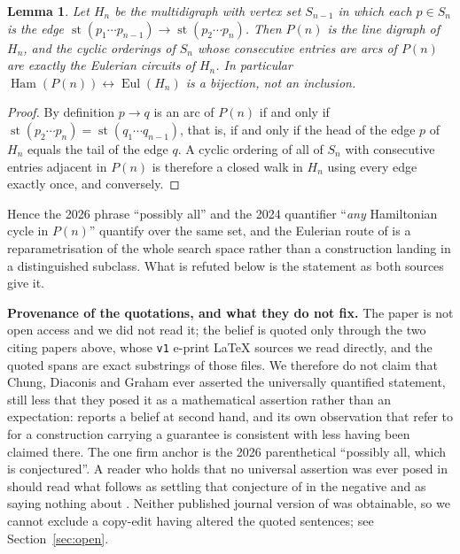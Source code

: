 \documentclass[11pt]{amsart}
\newtheorem{lemma}[theorem]{Lemma}
\DeclareMathOperator{\stt}{st}
\DeclareMathOperator{\Ham}{Ham}
\DeclareMathOperator{\Eul}{Eul}
\begin{document}
\begin{lemma}\label{lem:bij}
Let $H_n$ be the multidigraph with vertex set $S_{n-1}$ in which each
$p\in S_n$ is the edge $\stt(p_1\cdots p_{n-1})\to\stt(p_2\cdots p_n)$. Then
$P(n)$ is the line digraph of $H_n$, and the cyclic orderings of $S_n$ whose
consecutive entries are arcs of $P(n)$ are exactly the Eulerian circuits of
$H_n$. In particular $\Ham(P(n))\leftrightarrow\Eul(H_n)$ is a bijection, not
an inclusion.
\end{lemma}

\begin{proof}
By definition $p\to q$ is an arc of $P(n)$ if and only if
$\stt(p_2\cdots p_n)=\stt(q_1\cdots q_{n-1})$, that is, if and only if the head
of the edge $p$ of $H_n$ equals the tail of the edge $q$. A cyclic ordering of
all of $S_n$ with consecutive entries adjacent in $P(n)$ is therefore a closed
walk in $H_n$ using every edge exactly once, and conversely.
\end{proof}

Hence the 2026 phrase ``possibly all'' and the 2024 quantifier ``\emph{any}
Hamiltonian cycle in $P(n)$'' quantify over the same set, and the Eulerian
route of \cite{KQ2026} is a reparametrisation of the whole search space rather
than a construction landing in a distinguished subclass. What is refuted below
is the statement as both sources give it.

\medskip\noindent\textbf{Provenance of the quotations, and what they do not
fix.} The paper \cite{CDG1992} is not open access and we did not read it; the
belief is quoted only through the two citing papers above, whose \texttt{v1}
e-print \LaTeX{} sources we read directly, and the quoted spans are exact
substrings of those files. We therefore do not claim that Chung, Diaconis and
Graham ever asserted the universally quantified statement, still less that they
posed it as a mathematical assertion rather than an expectation: \cite{KQ2024}
reports a belief at second hand, and its own observation that \cite{CDG1992}
refer to \cite{Hurlbert} for a construction carrying a guarantee is consistent
with less having been claimed there. The one firm anchor is the 2026
parenthetical ``possibly all, which is conjectured''. A reader who holds that no
universal assertion was ever posed in \cite{CDG1992} should read what follows as
settling that conjecture of \cite{KQ2026} in the negative and as saying nothing
about \cite{CDG1992}. Neither published journal version of \cite{KQ2024,KQ2026}
was obtainable, so we cannot exclude a copy-edit having altered the quoted
sentences; see Section~\ref{sec:open}.
\end{document}
